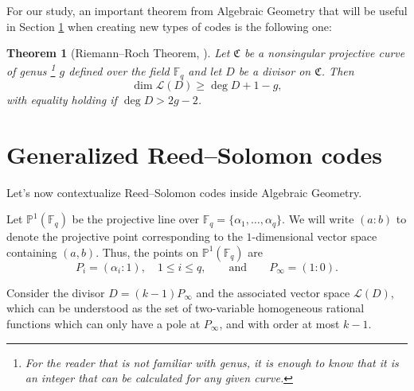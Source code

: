 \documentclass[11pt, oneside]{amsart}
\newtheorem{thm}{Theorem}[section]
\theoremstyle{definition}
\theoremstyle{remark}
\numberwithin{equation}{section}
\begin{document}
For our study, an important theorem from Algebraic Geometry that will be useful in Section \ref{s:grs} when creating new types of codes is the following one:
\begin{thm}[Riemann--Roch Theorem, \cite{Wal00}]
	Let $\mathfrak C$ be a nonsingular projective curve of genus%
	\footnote{For the reader that is not familiar with genus, it is enough to know that it is an integer that can be calculated for any given curve.}
	$g$ defined over the field $\mathbb{F}_q$ and let $D$ be a divisor on $\mathfrak C$.
	Then
	\begin{equation}
		\dim \mathcal L(D) \ge \deg D + 1 - g,
	\end{equation}
	with equality holding if $\deg D > 2g - 2$.
\end{thm}


\section{Generalized Reed--Solomon codes} \label{s:grs}
Let's now contextualize Reed--Solomon codes inside Algebraic Geometry.

Let $\mathbb{P}^1(\mathbb{F}_q)$ be the projective line over $\mathbb{F}_q = \{\alpha_1, \dots, \alpha_q\}$.
We will write $(a : b)$ to denote the projective point corresponding to the $1$-dimensional vector space containing $(a, b)$.
Thus, the points on $\mathbb{P}^1(\mathbb{F}_q)$ are
\begin{equation}
	P_i = (\alpha_i : 1), \quad 1 \le i \le q, \qquad \text{and} \qquad 
	P_\infty = (1 : 0).
\end{equation}

Consider the divisor $D = (k-1)P_\infty$ and the associated vector space $\mathcal L(D)$, which can be understood as the set of two-variable homogeneous rational functions which can only have a pole at $P_\infty$, and with order at most $k-1$.
\end{document}
